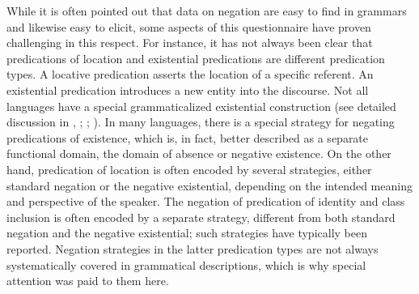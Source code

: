\documentclass[output=paper,colorlinks,citecolor=brown]{langscibook}
\begin{document}
While it is often pointed out that data on negation are easy to find in grammars and likewise easy to elicit, some aspects of this questionnaire have proven challenging in this respect. For instance, it has not always been clear that predications of location and existential predications are different predication types. A locative predication asserts the location of a specific referent. An existential predication introduces a new entity into the discourse. Not all languages have a special grammaticalized existential construction (see detailed discussion in \cite{Creissels2014}, \citeyear{Creissels2019}; \cite{Haspelmath2021}; \cite{VeselinovaHamari2022intro}). In many languages, there is a special strategy for negating predications of existence, which is, in fact, better described as a separate functional domain, the domain of absence or negative existence. On the other hand, predication of location is often encoded by several strategies, either standard negation or the negative existential, depending on the intended meaning and perspective of the speaker. The negation of predication of identity and class inclusion is often encoded by a separate strategy, different from both standard negation and the negative existential; such  strategies have typically been reported. Negation strategies in the latter predication types are not always systematically covered in grammatical descriptions, which is why special attention was paid to them here. 
\end{document}
